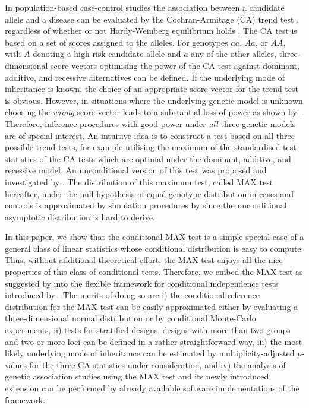 \documentclass[bimj,fleqn]{w-art}
\begin{document}
In population-based case-control studies the association between a 
candidate allele and a disease can be evaluated by the Cochran-Armitage 
(CA) trend test \citep{Armitage:1955}, regardless of
whether or not Hardy-Weinberg equilibrium holds 
\citep{Sasieni:1997}. 
The CA test is based on a set of scores assigned to the alleles. 
For genotypes $aa$, $Aa$, or $AA$, with $A$ denoting a high risk 
candidate allele and $a$ any of the other alleles, 
three-dimensional score vectors optimising the power of the CA test
against dominant, additive, and recessive alternatives can be defined. 
If the underlying mode of inheritance is known, the choice of
an appropriate score vector for the trend test is obvious. 
However, in situations where the underlying genetic model is unknown
choosing the \textit{wrong} score vector leads to a substantial loss of power
as shown by \citet{Freidlin:2002}.
Therefore, inference procedures
with good power under \textit{all} three genetic models 
are of special interest.
An intuitive idea is to construct a test based on all three possible
trend tests, for example utilising the maximum of the standardised 
test statistics of the CA tests which are optimal under the dominant, 
additive, and recessive model.
An unconditional version of this test was proposed and investigated by \citet{Freidlin:2002}. 
The distribution of this maximum test, called MAX test hereafter,
under the null hypothesis of equal genotype distribution
in cases and controls is approximated by simulation procedures
by \citet{Freidlin:2002}
since the unconditional asymptotic distribution is hard to derive.

In this paper, we show that the conditional MAX test is a simple special
case of a general class of linear statistics whose conditional
distribution is easy to compute. Thus, without additional
theoretical effort, the MAX test enjoys all the nice properties
of this class of conditional tests. Therefore, we embed the MAX test as suggested by 
\citet{Freidlin:2002} into the flexible framework for 
conditional independence tests introduced by 
\citet{StrasserWeber1999}. The merits of doing so are
i) the conditional reference distribution for the MAX test can be easily 
approximated either by evaluating a three-dimensional normal distribution
or by conditional Monte-Carlo experiments,
ii) tests for stratified designs, designs with more than two
groups and two or more loci can be defined in a rather 
straightforward way, iii) the most likely underlying
mode of inheritance can be estimated by
multiplicity-adjusted $p$-values for the
three CA statistics under consideration, and iv) the analysis of 
genetic association studies using the MAX test and its newly
introduced extension can be performed by already
available software implementations of the 
\citet{StrasserWeber1999} framework.
\end{document}
